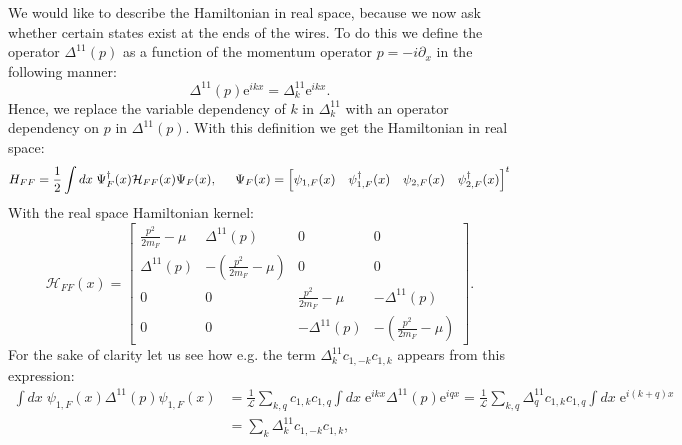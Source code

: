 We would like to describe the Hamiltonian in real space, because we now ask whether certain states exist at the ends of the wires. To do this we define the operator $\Delta^{11}(p)$ as a function of the momentum operator $p = -i\partial_x$ in the following manner:
\begin{equation}
\Delta^{11}(p)\text{e}^{ikx} = \Delta^{11}_k\text{e}^{ikx}.
\label{eq.Deltapdef}
\end{equation}
Hence, we replace the variable dependency of $k$ in $\Delta^{11}_k$ with an operator dependency on $p$ in $\Delta^{11}(p)$. With this definition we get the Hamiltonian in real space:
\begin{equation}
H_{FF} = \frac{1}{2}\int dx\; \Psi^\dagger_{F}(x) \mathcal{H}_{FF}(x) \Psi_{F}(x), \hspace{0.5cm} \Psi_{F}(x) = \begin{bmatrix} \psi_{1,F}(x) & \psi^\dagger_{1,F}(x) & \psi_{2,F}(x) & \psi^\dagger_{2,F}(x)\end{bmatrix}^t
\label{eq.2wiresMFHamiltonianrealspace}
\end{equation}
With the real space Hamiltonian kernel:
\begin{equation}
\mathcal{H}_{FF}(x) = \begin{bmatrix} 
\frac{p^2}{2m_F} - \mu & \Delta^{11}(p) & 0 & 0 \\
\Delta^{11}(p) & -\left(\frac{p^2}{2m_F} - \mu \right) & 0 & 0 \\
0 & 0 & \frac{p^2}{2m_F} - \mu & -\Delta^{11}(p) \\
0 & 0 & -\Delta^{11}(p) & -\left(\frac{p^2}{2m_F} - \mu \right)
\end{bmatrix}.
\label{eq.2wiresMFHamiltonianrealspacefirstquantization}
\end{equation}
For the sake of clarity let us see how e.g. the term $\Delta^{11}_kc_{1,-k}c_{1,k}$ appears from this expression:
\begin{align}
\int dx \; \psi_{1,F}(x) \Delta^{11}(p) \psi_{1,F}(x) &= \frac{1}{\mathcal{L}}\sum_{k,q}c_{1,k} c_{1,q}\int dx \; \text{e}^{ikx}\Delta^{11}(p)\text{e}^{iqx} = \frac{1}{\mathcal{L}}\sum_{k,q}\Delta^{11}_qc_{1,k}c_{1,q}\int dx \; \text{e}^{i(k + q)x} \nonumber \\
&= \sum_{k}\Delta^{11}_kc_{1,-k}c_{1,k}, \nonumber 
\end{align}
